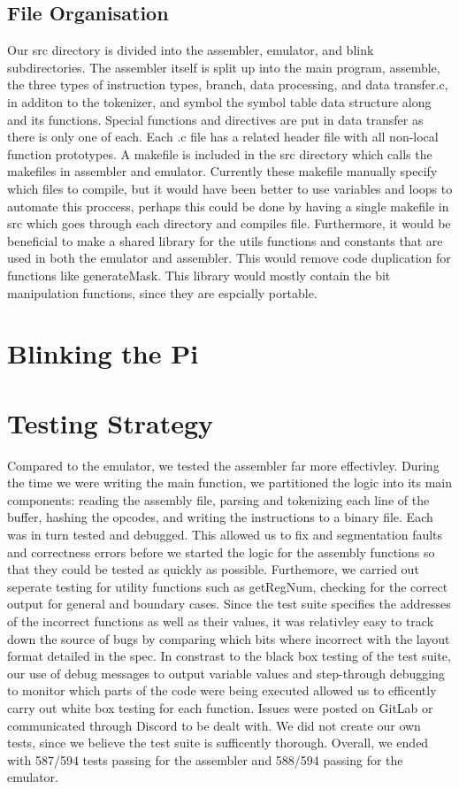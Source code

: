 \documentclass[11pt]{article}
\begin{document}
\subsection{File Organisation}
Our src directory is divided into the assembler, emulator, and blink subdirectories. The assembler itself is split up into the main program, assemble, the three types of instruction types, branch, data processing, and data transfer.c, in additon to the tokenizer, and symbol the symbol table data structure along and its functions. Special functions and directives are put in data transfer as there is only one of each. Each .c file has a related header file with all non-local function prototypes. A makefile is included in the src directory which calls the makefiles in assembler and emulator. Currently these makefile manually specify which files to compile, but it would have been better to use variables and loops to automate this proccess, perhaps this could be done by having a single makefile in src which goes through each directory and compiles file. Furthermore, it would be beneficial to make a shared library for the utils functions and constants that are used in both the emulator and assembler. This would remove code duplication for functions like generateMask. This library would mostly contain the bit manipulation functions, since they are espcially portable. 

\section{Blinking the Pi}


\section{Testing Strategy}
Compared to the emulator, we tested the assembler far more effectivley. During the time we were writing the main function, we partitioned the logic into its main components: reading the assembly file, parsing and tokenizing each line of the buffer, hashing the opcodes, and writing the instructions to a binary file. Each was in turn tested and debugged. This allowed us to fix and segmentation faults and correctness errors before we started the logic for the assembly functions so that they could be tested as quickly as possible. Furthemore, we carried out seperate testing for utility functions such as getRegNum, checking for the correct output for general and boundary cases. Since the test suite specifies the addresses of the incorrect functions as well as their values, it was relativley easy to track down the source of bugs by comparing which bits where incorrect with the layout format detailed in the spec. In constrast to the black box testing of the test suite, our use of debug messages to output variable values and step-through debugging to monitor which parts of the code were being executed allowed us to efficently carry out white box testing for each function. Issues were posted on GitLab or communicated through Discord to be dealt with. We did not create our own tests, since we believe the test suite is sufficently thorough. Overall, we ended with 587/594 tests passing for the assembler and 588/594 passing for the emulator. 
\end{document}
